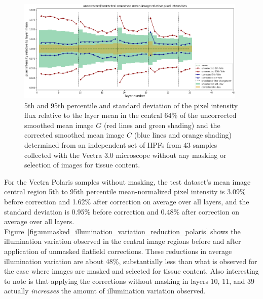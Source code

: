 \documentclass[letterpaper,11pt]{article}
\newcommand{\reffig}[1]{Figure~\ref{#1}}
\begin{document}
\begin{figure}[!ht]
\centering
\includegraphics[width=0.98\textwidth]{images/results/unmasked_flatfield_illumination_variation_reduction_vectra}
\caption{\footnotesize 5th and 95th percentile and standard deviation of the pixel intensity flux relative to the layer mean in the central 64\% of the uncorrected smoothed mean image $G$ (red lines and green shading) and the corrected smoothed mean image $C$ (blue lines and orange shading) determined from an independent set of HPFs from 43 samples collected with the Vectra 3.0 microscope without any masking or selection of images for tissue content.}
\label{fig:unmasked_illumination_variation_reduction_vectra}
\end{figure} 

For the Vectra Polaris samples without masking, the test dataset's mean image central region 5th to 95th percentile mean-normalized pixel intensity is 3.09\% before correction and 1.62\% after correction on average over all layers, and the standard deviation is 0.95\% before correction and 0.48\% after correction on average over all layers. \reffig{fig:unmasked_illumination_variation_reduction_polaris} shows the illumination variation observed in the central image regions before and after application of unmasked flatfield corrections. These reductions in average illumination variation are about 48\%, substantially less than what is observed for the case where images are masked and selected for tissue content. Also interesting to note is that applying the corrections without masking in layers 10, 11, and 39 actually \textit{increases} the amount of illumination variation observed.
\end{document}
